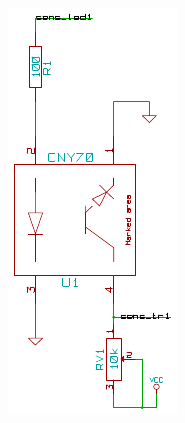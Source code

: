 \documentclass[compress]{beamer}
\begin{document}
\begin{frame}[fragile]
\begin{columns}
\begin{center}
\includegraphics[width=0.8\columnwidth]{./img/sensor.pdf}

\end{center}
\end{columns}
\end{frame}
\end{document}
